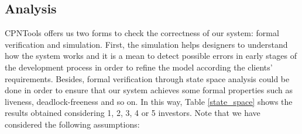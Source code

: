 \subsection{Analysis}\label{analysis}
CPNTools offers us two forms to check the correctness of our system: formal verification and simulation. 
First, the simulation helps designers to understand how the system works and it is a mean to
detect possible errors in early stages of the development process in order to refine the model according the
clients' requirements. Besides, formal verification through state space
analysis could be done in order to ensure that our system achieves some formal properties such as liveness, deadlock-freeness and so on.
In this way, Table \ref{state_space} shows the
results obtained considering 1, 2, 3, 4 or 5 investors. Note that we have considered the following assumptions:

